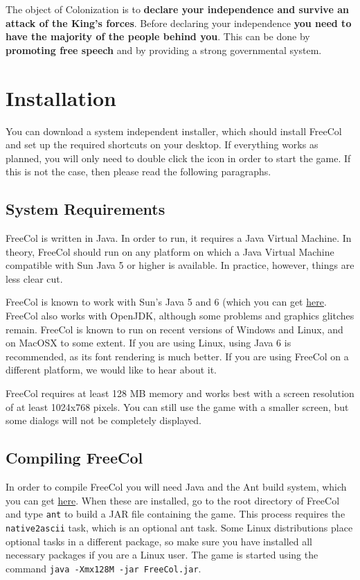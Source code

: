 \documentclass[12pt]{article}
\begin{document}
The object of Colonization is to \textbf{declare your independence and
survive an attack of the King's forces}. Before declaring your
independence \textbf{you need to have the majority of the people
behind you}. This can be done by \textbf{promoting free speech} and by
providing a strong governmental system.


\hypertarget{Installation}{\section{Installation}}

You can download a system independent installer, which should install
FreeCol and set up the required shortcuts on your desktop. If
everything works as planned, you will only need to double click the
icon in order to start the game. If this is not the case, then please
read the following paragraphs.

\hypertarget{System Requirements}{\subsection{System Requirements}}

FreeCol is written in Java. In order to run, it requires a Java
Virtual Machine. In theory, FreeCol should run on any platform on
which a Java Virtual Machine compatible with Sun Java 5 or higher is
available. In practice, however, things are less clear cut.

FreeCol is known to work with Sun's Java 5 and 6 (which you can get
\href{http://java.sun.com/}{here}. FreeCol also works with OpenJDK,
although some problems and graphics glitches remain. FreeCol is known
to run on recent versions of Windows and Linux, and on MacOSX to some
extent. If you are using Linux, using Java 6 is recommended, as its
font rendering is much better. If you are using FreeCol on a different
platform, we would like to hear about it.

FreeCol requires at least 128 MB memory and works best with a screen
resolution of at least 1024x768 pixels. You can still use the game
with a smaller screen, but some dialogs will not be completely
displayed.

\hypertarget{Compiling FreeCol}{\subsection{Compiling FreeCol}}

In order to compile FreeCol you will need Java and the Ant build
system, which you can get \href{http://ant.apache.org/}{here}. When
these are installed, go to the root directory of FreeCol and type
\verb$ant$ to build a JAR file containing the game. This process
requires the \verb$native2ascii$ task, which is an
optional ant task. Some Linux distributions place optional tasks in a
different package, so make sure you have installed all necessary
packages if you are a Linux user. The game is started using the
command \verb$java -Xmx128M -jar FreeCol.jar$.
\end{document}
